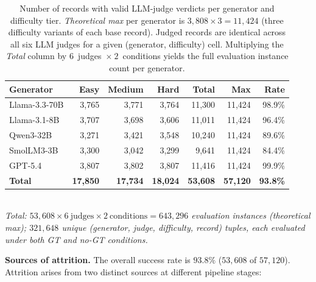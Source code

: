 \begin{table}[!htbp]
\centering
\small
\setlength{\tabcolsep}{8pt}
\renewcommand{\arraystretch}{1.2}
\caption{Number of records with valid LLM-judge verdicts per generator and difficulty tier. \emph{Theoretical max} per generator is $3{,}808 \times 3 = 11{,}424$ (three difficulty variants of each base record). Judged records are identical across all six LLM judges for a given (generator, difficulty) cell. Multiplying the \emph{Total} column by $6$~judges~$\times~2$~conditions yields the full evaluation instance count per generator.}
\label{tab:eval-stats}
\begin{tabularx}{0.82\textwidth}{@{}lrrrrrr@{}}
\toprule
\textbf{Generator} & \textbf{Easy} & \textbf{Medium} & \textbf{Hard} & \textbf{Total} & \textbf{Max} & \textbf{Rate} \\
\midrule
Llama-3.3-70B  & 3{,}765 & 3{,}771 & 3{,}764 & 11{,}300 & 11{,}424 & 98.9\% \\
Llama-3.1-8B   & 3{,}707 & 3{,}698 & 3{,}606 & 11{,}011 & 11{,}424 & 96.4\% \\
Qwen3-32B      & 3{,}271 & 3{,}421 & 3{,}548 & 10{,}240 & 11{,}424 & 89.6\% \\
SmolLM3-3B     & 3{,}300 & 3{,}042 & 3{,}299 &  9{,}641 & 11{,}424 & 84.4\% \\
GPT-5.4        & 3{,}807 & 3{,}802 & 3{,}807 & 11{,}416 & 11{,}424 & 99.9\% \\
\midrule
\textbf{Total} & \textbf{17{,}850} & \textbf{17{,}734} & \textbf{18{,}024} & \textbf{53{,}608} & \textbf{57{,}120} & \textbf{93.8\%} \\
\bottomrule
\end{tabularx}
\vspace{4pt}
{\small\textit{\\Total: $53{,}608 \times 6\ \mathrm{judges} \times 2\ \mathrm{conditions} = 643{,}296$ evaluation instances (theoretical max); $321{,}648$ unique (generator, judge, difficulty, record) tuples, each evaluated under both GT and no-GT conditions.}}
\end{table}

\textbf{Sources of attrition.} The overall success rate is $93.8\%$ ($53{,}608$ of $57{,}120$). Attrition arises from two distinct sources at different pipeline stages:

